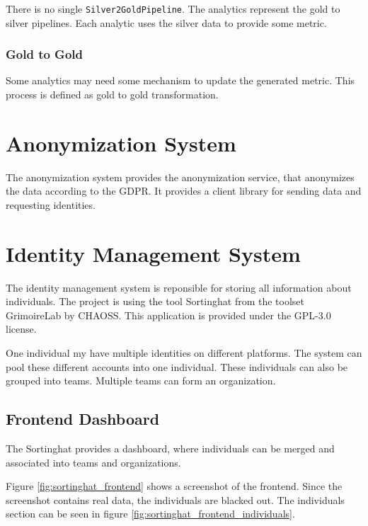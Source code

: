 There is no single \texttt{Silver2GoldPipeline}. The analytics represent the gold to silver pipelines. Each analytic uses the silver data to provide some metric.

\subsubsection{Gold to Gold}
\label{subsubsec:gold2gold}

Some analytics may need some mechanism to update the generated metric. This process is defined as gold to gold transformation.

\section{Anonymization System}
\label{sec:anonymization_system}

The anonymization system provides the anonymization service, that anonymizes the data according to the \ac{GDPR}.
It provides a client library for sending data and requesting identities. 

\section{Identity Management System}
\label{sec:identity_management_system}

The identity management system is reponsible for storing all information about individuals. The project is using the tool Sortinghat from the toolset GrimoireLab by CHAOSS. This application is provided under the GPL-3.0 license.

One individual my have multiple identities on different platforms. The system can pool these different accounts into one individual. These individuals can also be grouped into teams. Multiple teams can form an organization.  \autocite{sortinghat} \autocite{sortinghat_repo}

\subsection{Frontend Dashboard}
\label{subsubsec:front_end_dashboard}

The Sortinghat provides a dashboard, where individuals can be merged and associated into teams and organizations.

Figure \ref{fig:sortinghat_frontend} shows a screenshot of the frontend. Since the screenshot contains real data, the individuals are blacked out. The individuals section can be seen in figure \ref{fig:sortinghat_frontend_individuals}.

